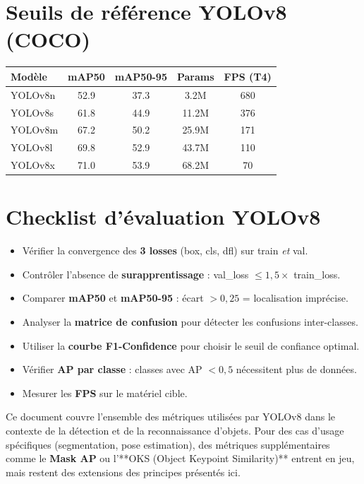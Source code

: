 \documentclass[12pt, a4paper]{report}
\begin{document}
\section{Seuils de référence YOLOv8 (COCO)}

\begin{center}
\begin{tabular}{lcccc}
  \toprule
  \textbf{Modèle} & \textbf{mAP50} & \textbf{mAP50-95} & \textbf{Params} & \textbf{FPS (T4)} \\
  \midrule
  YOLOv8n & 52.9 & 37.3 & 3.2M  & 680 \\
  YOLOv8s & 61.8 & 44.9 & 11.2M & 376 \\
  YOLOv8m & 67.2 & 50.2 & 25.9M & 171 \\
  YOLOv8l & 69.8 & 52.9 & 43.7M & 110 \\
  YOLOv8x & 71.0 & 53.9 & 68.2M & 70  \\
  \bottomrule
\end{tabular}
\end{center}

\section{Checklist d'évaluation YOLOv8}

\begin{tcolorbox}[colback=lightblue, colframe=yoloblue,
  title={\textbf{Checklist : évaluer un modèle YOLOv8}}, breakable]
  \begin{itemize}
    \item[$\square$] Vérifier la convergence des \textbf{3 losses} (box, cls, dfl)
          sur train \emph{et} val.
    \item[$\square$] Contrôler l'absence de \textbf{surapprentissage} :
          val\_loss $\leq 1{,}5 \times$ train\_loss.
    \item[$\square$] Comparer \textbf{mAP50} et \textbf{mAP50-95} : écart $> 0{,}25$
          = localisation imprécise.
    \item[$\square$] Analyser la \textbf{matrice de confusion} pour détecter les
          confusions inter-classes.
    \item[$\square$] Utiliser la \textbf{courbe F1-Confidence} pour choisir le
          seuil de confiance optimal.
    \item[$\square$] Vérifier \textbf{AP par classe} : classes avec AP $< 0{,}5$
          nécessitent plus de données.
    \item[$\square$] Mesurer les \textbf{FPS} sur le matériel cible.
  \end{itemize}
\end{tcolorbox}

\bigskip
\begin{notebox}
  Ce document couvre l'ensemble des métriques utilisées par YOLOv8 dans le
  contexte de la détection et de la reconnaissance d'objets. Pour des cas
  d'usage spécifiques (segmentation, pose estimation), des métriques
  supplémentaires comme le \textbf{Mask AP} ou l'**OKS (Object Keypoint
  Similarity)** entrent en jeu, mais restent des extensions des principes
  présentés ici.
\end{notebox}
\end{document}
